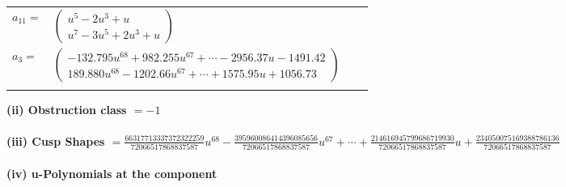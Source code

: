 \documentclass[1p]{elsarticle_modified}
\theoremstyle{definition}
\begin{document}
\begin{tabular}{m{7pt} m{180pt} m{7pt} m{180pt} }
\flushright $a_{11}=$&$\begin{pmatrix}u^5-2 u^3+u\\u^7-3 u^5+2 u^3+u\end{pmatrix}$ \\
\flushright $a_{3}=$&$\begin{pmatrix}-132.795 u^{68}+982.255 u^{67}+\cdots-2956.37 u-1491.42\\189.880 u^{68}-1202.66 u^{67}+\cdots+1575.95 u+1056.73\end{pmatrix}$\\&\end{tabular}
\flushleft \textbf{(ii) Obstruction class $= -1$}\\~\\
\flushleft \textbf{(iii) Cusp Shapes $= \frac{66317713337372322259}{72066517868837587} u^{68}-\frac{395960086414396085656}{72066517868837587} u^{67}+\cdots+\frac{214616945799686719930}{72066517868837587} u+\frac{234050075169388786136}{72066517868837587}$}\\~\\
\newpage\renewcommand{\arraystretch}{1}
\flushleft \textbf{(iv) u-Polynomials at the component}\newline \\
\end{document}
